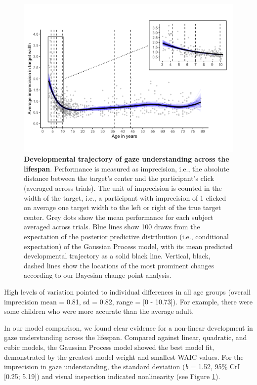 \documentclass[
  man,mask,floatsintext]{apa6}
\begin{document}
\begin{figure}

{\centering \includegraphics[width=1\linewidth]{../figures/lifespan_plot} 

}

\caption{\textbf{Developmental trajectory of gaze understanding across the lifespan}. Performance is measured as imprecision, i.e., the absolute distance between the target's center and the participant's click (averaged across trials). The unit of imprecision is counted in the width of the target, i.e., a participant with imprecision of 1 clicked on average one target width to the left or right of the true target center. Grey dots show the mean performance for each subject averaged across trials. Blue lines show 100 draws from the expectation of the posterior predictive distribution (i.e., conditional expectation) of the Gaussian Process model, with its mean predicted developmental trajectory as a solid black line. Vertical, black, dashed lines show the locations of the most prominent changes according to our Bayesian change point analysis.}\label{fig:fig1}
\end{figure}

High levels of variation pointed to individual differences in all age groups (overall imprecision mean = 0.81, sd = 0.82, range = {[}0 - 10.73{]}). For example, there were some children who were more accurate than the average adult.

In our model comparison, we found clear evidence for a non-linear development in gaze understanding across the lifespan. Compared against linear, quadratic, and cubic models, the Gaussian Process model showed the best model fit, demonstrated by the greatest model weight and smallest WAIC values. For the imprecision in gaze understanding, the standard deviation (\emph{b} = 1.52, 95\% CrI {[}0.25; 5.19{]}) and visual inspection indicated nonlinearity (see Figure \ref{fig:fig1}).
\end{document}
